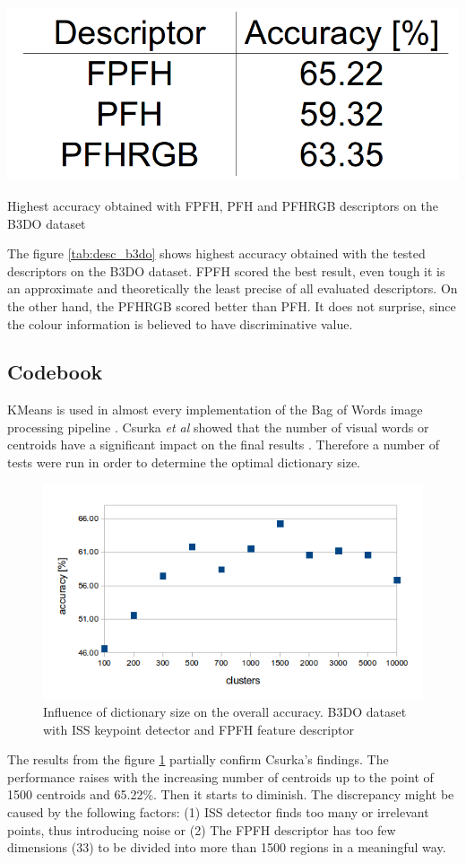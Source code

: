 	\begin{table}[!ht]
	\centering	
	\includegraphics[width=.25\textwidth]{figs/desc_b3do}
	\caption{Highest accuracy obtained with FPFH, PFH and PFHRGB descriptors on the B3DO dataset}
	\label{tab:desc_b3do}
	\end{table}
	
	The figure \ref{tab:desc_b3do} shows highest accuracy obtained with the tested descriptors on the B3DO dataset. FPFH scored the best result, even tough it is an approximate and theoretically the least precise of all evaluated descriptors. On the other hand, the PFHRGB scored better than PFH. It does not surprise, since the colour information is believed to have discriminative value.
		
	\subsection{Codebook}
	KMeans is used in almost every implementation of the Bag of Words image processing pipeline \cite{tsai2012bag, toldo2009bag}. Csurka \emph{et al} showed that the number of visual words or centroids have a significant impact on the final results \cite{csurka2004visual}. Therefore a number of tests were run in order to determine the optimal dictionary size.
	
	\begin{figure}[!ht]
	\centering	
	\includegraphics[width=.75\textwidth]{figs/clustering_centroids_b3do}
	\caption{Influence of dictionary size on the overall accuracy. B3DO dataset with ISS keypoint detector and FPFH feature descriptor}
	\label{fig:cluster_b3do}
	\end{figure}
	
	The results from the figure \ref{fig:cluster_b3do} partially confirm Csurka's findings. The performance raises with the increasing number of centroids up to the point of 1500 centroids and 65.22\%. Then it starts to diminish. The discrepancy might be caused by the following factors: (1) ISS detector finds too many or irrelevant points, thus introducing noise or (2) The FPFH descriptor has too few dimensions (33) to be divided into more than 1500 regions in a meaningful way. 

